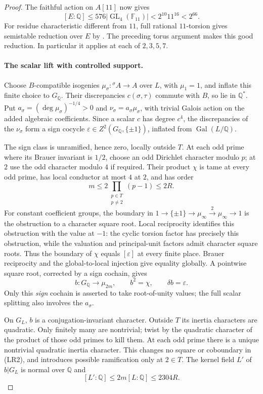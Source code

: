 \documentclass[11pt]{article}
\theoremstyle{definition}
\theoremstyle{remark}
\begin{document}
\begin{proof}
The faithful action on $A[11]$ now gives
\[
 [E:\mathbb Q]\le576|\operatorname{GL}_4(\mathbb F_{11})|
 <2^{10}11^{16}<2^{66}.
\tag{LR1}
\]
For residue characteristic different from $11$, full rational
$11$-torsion gives semistable reduction over $E$ by
\cite[Theorem 3.5, p.~406]{silverbergzarhin}. The preceding torus
argument makes this good reduction. In particular it applies at
each of $2,3,5,7$.

\paragraph{The scalar lift with controlled support.}
Choose $B$-compatible isogenies $\mu_\sigma:{}^\sigma A\to A$ over $L$,
with $\mu_1=1$, and inflate this finite choice to $G_{\mathbb Q}$.
Their discrepancies $c(\sigma,\tau)$ commute with $B$, so lie in
$\mathbb Q^*$. Put $a_\sigma=(\deg\mu_\sigma)^{-1/4}>0$ and
$\nu_\sigma=a_\sigma\mu_\sigma$, with trivial Galois action on the
added algebraic coefficients. Since a scalar $c$ has degree $c^4$,
the discrepancies of the $\nu_\sigma$ form a sign cocycle
$\varepsilon\in Z^2(G_{\mathbb Q},\{\pm1\})$, inflated from
$\operatorname{Gal}(L/\mathbb Q)$.

The sign class is unramified, hence zero, locally outside $T$.
At each odd prime where its Brauer invariant is $1/2$, choose an odd
Dirichlet character modulo $p$; at $2$ use the odd character modulo
$4$ if required. Their product $\chi$ is tame at every odd prime,
has local conductor at most $4$ at $2$, and has order
\[
 m\le2\prod_{\substack{p\in T\\p\ne2}}(p-1)\le2R.
\]
For constant coefficient groups, the boundary in
$1\to\{\pm1\}\to\mu_\infty\xrightarrow{2}\mu_\infty\to1$
is the obstruction to a character square root. Local reciprocity
identifies this obstruction with the value at $-1$: the cyclic
torsion factor has precisely this obstruction, while the valuation
and principal-unit factors admit character square roots.
Thus the boundary of $\chi$ equals $[\varepsilon]$ at every finite
place. Brauer reciprocity and the global-to-local injection give
equality globally. A pointwise square root, corrected by a sign
cochain, gives
\[
 b:G_{\mathbb Q}\longrightarrow\mu_{2m},\qquad
 b^2=\chi,\qquad\delta b=\varepsilon.
\tag{LR2}
\]
Only this \emph{sign} cochain is asserted to take root-of-unity values;
the full scalar splitting also involves the $a_\sigma$.

On $G_L$, $b$ is a conjugation-invariant character. Outside $T$ its
inertia characters are quadratic. Only finitely many are nontrivial;
twist by the quadratic character of the product of those odd primes
to kill them. At each odd prime there is a unique nontrivial quadratic
inertia character. This changes no square or coboundary in (LR2),
and introduces possible ramification only at $2\in T$.
The kernel field $L'$ of $b|G_L$ is normal over $\mathbb Q$ and
\[
 [L':\mathbb Q]\le2m[L:\mathbb Q]\le2304R.
\tag{LR3}
\]


\end{proof}
\end{document}
